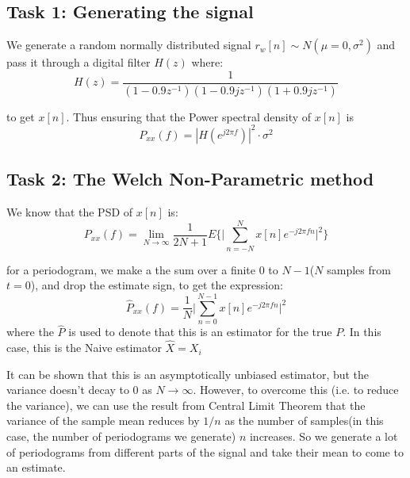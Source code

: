 \documentclass{article}
\begin{document}
\subsection{Task 1: Generating the signal}
We generate a random normally distributed signal $r_w[n]\sim N(\mu=0,\sigma^2)$ and pass it through a digital filter $H(z)$ where:
\begin{equation}
    H(z)=\frac{1}{(1-0.9z^{-1})(1-0.9jz^{-1})(1+0.9jz^{-1})}
\end{equation}

to get $x[n]$. Thus ensuring that the Power spectral density of $x[n]$ is
\begin{equation}
  P_{xx}(f)=|H(e^{j2\pi f})|^2 \cdot \sigma^2
\end{equation}

\subsection{Task 2: The Welch Non-Parametric method}
We know that the PSD of $x[n]$ is:
\begin{equation}
  P_{xx}(f)=\lim_{N\rightarrow \infty} \frac{1}{2N+1} E\Big\{\Big|\sum_{n=-N}^{N} x[n] e^{-j2\pi fn}\Big|^2\Big\}
\end{equation}

for a periodogram, we make a the sum over a finite $0$ to $N-1$($N$ samples from $t=0$), and drop the estimate sign, to get the expression:
\begin{equation}
    \hat{P}_{xx}(f)=\frac{1}{N}\Big|\sum_{n=0}^{N-1}x[n] e^{-j2\pi fn}\Big|^2
\end{equation}
where the $\hat{P}$ is used to denote that this is an estimator for the true $P$. In this case, this is the Naive estimator $\hat{X}=X_i$


It can be shown that this is an asymptotically unbiased estimator, but the variance doesn't decay to $0$ as $N\rightarrow \infty$. However, to overcome this (i.e. to reduce the variance), we can use the result from Central Limit Theorem that the variance of the sample mean reduces by $1/n$ as the number of samples(in this case, the number of periodograms we generate) $n$ increases. So we generate a lot of periodograms from different parts of the signal and take their mean to come to an estimate. 
\end{document}
